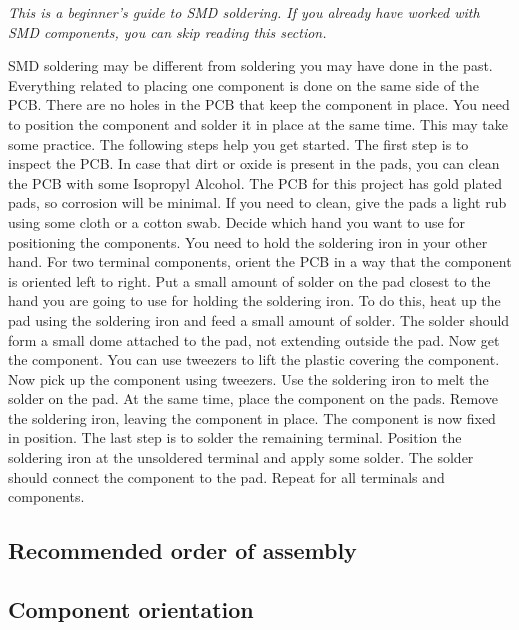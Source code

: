 \documentclass[12pt]{article}
\begin{document}
\textit{This is a beginner's guide to SMD soldering. If you already have worked with SMD components, you can skip reading this section.}
\vspace{1ex}

SMD soldering may be different from soldering you may have done in the past. Everything related to placing one component is done on the same side of the PCB. There are no holes in the PCB that keep the component in place. You need to position the component and solder it in place at the same time. This may take some practice. The following steps help you get started.
\newline
The first step is to inspect the PCB. In case that dirt or oxide is present in the pads, you can clean the PCB with some Isopropyl Alcohol. The PCB for this project has gold plated pads, so corrosion will be minimal. If you need to clean, give the pads a light rub using some cloth or a cotton swab.
\newline
Decide which hand you want to use for positioning the components. You need to hold the soldering iron in your other hand. For two terminal components, orient the PCB in a way that the component is oriented left to right. Put a small amount of solder on the pad closest to the hand you are going to use for holding the soldering iron. To do this, heat up the pad using the soldering iron and feed a small amount of solder. The solder should form a small dome attached to the pad, not extending outside the pad.\newline
Now get the component. You can use tweezers to lift the plastic covering the component. Now pick up the component using tweezers. Use the soldering iron to melt the solder on the pad. At the same time, place the component on the pads. Remove the soldering iron, leaving the component in place.
\newline The component is now fixed in position. The last step is to solder the remaining terminal. Position the soldering iron at the unsoldered terminal and apply some solder. The solder should connect the component to the pad. Repeat for all terminals and components.

\subsection{Recommended order of assembly}




\clearpage 

\subsection{Component orientation}
\end{document}
